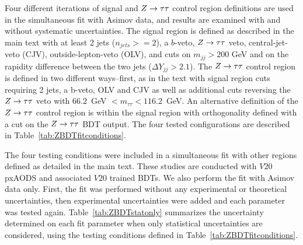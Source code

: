 Four different iterations of signal and $\Ztt$ control region definitions are used in the simultaneous fit with Asimov data, and results are examined with and without systematic uncertainties. The signal region is defined as described in the main text with at least 2 jets ($n_{jets}>=2$), a $b$-veto, $\Ztt$ veto, central-jet-veto (CJV), outside-lepton-veto (OLV), and cuts on $m_{jj}>200$ GeV and on the rapidity difference between the two jets ($\Delta Y_{jj}>2.1$). The $\Ztt$ control region is defined in two different ways--first, as in the text with signal region cuts requiring 2 jets, a b-veto, OLV and CJV as well as additional cuts reversing the $\Ztt$ veto with $66.2$~GeV $< m_{\tau\tau}< 116.2 $~GeV. An alternative definition of the $\Ztt$ control region is within the signal region with orthogonality defined with a cut on the $\Ztt$ BDT output. The four tested configurations are described in Table~\ref{tab:ZBDTfitconditions}. 

\begin{table}[h!]
\centering
{}
\caption{Four testing conditions for signal and $\Ztt$ control region definitions.}
\label{tab:ZBDTfitconditions}
\end{table}

The four testing conditions were included in a simultaneous fit with other regions defined as detailed in the main text. These studies are conducted with $V20$ pxAODS and associated $V20$ trained BDTs. We also perform the fit with Asimov data only. First, the fit was performed without any experimental or theoretical uncertainties, then experimental uncertainties were added and each parameter was tested again. Table~\ref{tab:ZBDTstatonly} summarizes the uncertainty determined on each fit parameter when only statistical uncertainties are considered, using the testing conditions defined in Table~\ref{tab:ZBDTfitconditions}. 

